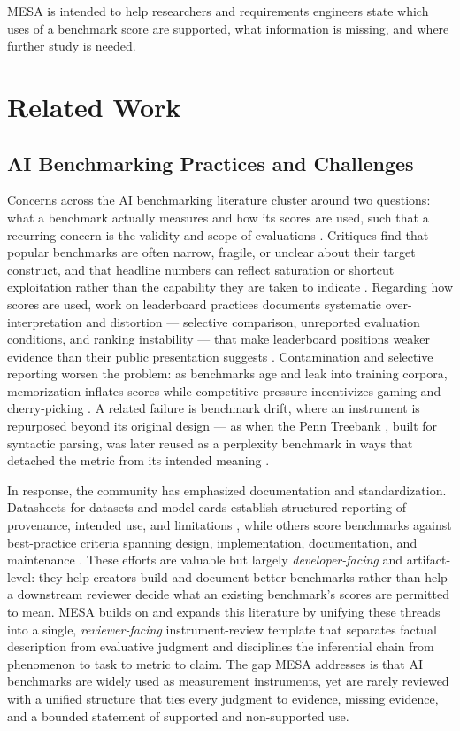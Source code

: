 \documentclass[conference]{IEEEtran}
\begin{document}
    MESA is intended to help researchers and requirements engineers state which uses of a benchmark score are supported, what information is missing, and where further study is needed.

\section{Related Work}

    \subsection{AI Benchmarking Practices and Challenges}
    
        Concerns across the AI benchmarking literature cluster around two questions: what a benchmark actually measures and how its scores are used, such that a recurring concern is the validity and scope of evaluations \cite{alonso_church_sigir}. Critiques find that popular benchmarks are often narrow, fragile, or unclear about their target construct, and that headline numbers can reflect saturation or shortcut exploitation rather than the capability they are taken to indicate \cite{jo_wilson_what_does_your_benchmark_measure,line_goes_up}. Regarding how scores are used, work on leaderboard practices documents systematic over-interpretation and distortion --- selective comparison, unreported evaluation conditions, and ranking instability --- that make leaderboard positions weaker evidence than their public presentation suggests \cite{singh_leaderboard_illusion}. Contamination and selective reporting worsen the problem: as benchmarks age and leak into training corpora, memorization inflates scores while competitive pressure incentivizes gaming and cherry-picking \cite{cheng_benchmarking_broken}. A related failure is benchmark drift, where an instrument is repurposed beyond its original design --- as when the Penn Treebank \cite{marcus_etal_1993_building}, built for syntactic parsing, was later reused as a perplexity benchmark in ways that detached the metric from its intended meaning \cite{alonso_church_sigir}.
        
        In response, the community has emphasized documentation and standardization. Datasheets for datasets and model cards establish structured reporting of provenance, intended use, and limitations \cite{gebru_datasheets_2021}, while others score benchmarks against best-practice criteria spanning design, implementation, documentation, and maintenance \cite{reuel_betterbench}. These efforts are valuable but largely \emph{developer-facing} and artifact-level: they help creators build and document better benchmarks rather than help a downstream reviewer decide what an existing benchmark's scores are permitted to mean. MESA builds on and expands this literature by unifying these threads into a single, \emph{reviewer-facing} instrument-review template that separates factual description from evaluative judgment and disciplines the inferential chain from phenomenon to task to metric to claim. The gap MESA addresses is that AI benchmarks are widely used as measurement instruments, yet are rarely reviewed with a unified structure that ties every judgment to evidence, missing evidence, and a bounded statement of supported and non-supported use.
    
\end{document}
